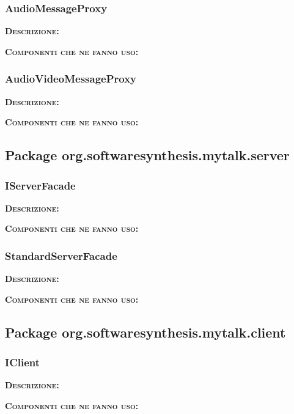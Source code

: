 \subsubsection{AudioMessageProxy}
\begin{description}
	\item{\scshape\bfseries Descrizione:} 
	\item{\scshape\bfseries Componenti che ne fanno uso:} 
\end{description}

\subsubsection{AudioVideoMessageProxy}
\begin{description}
	\item{\scshape\bfseries Descrizione:} 
	\item{\scshape\bfseries Componenti che ne fanno uso:} 
\end{description}

\subsection{Package org.softwaresynthesis.mytalk.server}
\subsubsection{IServerFacade}
\begin{description}
	\item{\scshape\bfseries Descrizione:} 
	\item{\scshape\bfseries Componenti che ne fanno uso:} 
\end{description}

\subsubsection{StandardServerFacade}
\begin{description}
	\item{\scshape\bfseries Descrizione:} 
	\item{\scshape\bfseries Componenti che ne fanno uso:} 
\end{description}

\subsection{Package org.softwaresynthesis.mytalk.client}
\subsubsection{IClient}
\begin{description}
	\item{\scshape\bfseries Descrizione:} 
	\item{\scshape\bfseries Componenti che ne fanno uso:} 
\end{description}

